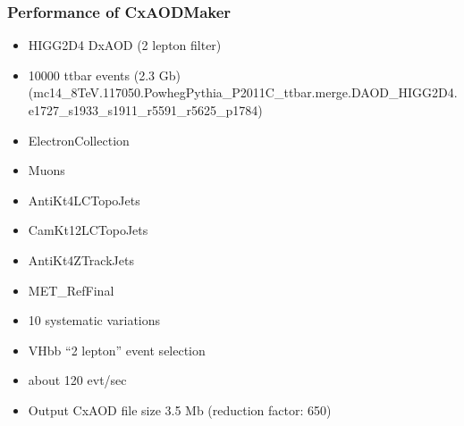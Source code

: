 \documentclass{beamer}
\begin{document}
\begin{frame}
\begin{center}
\end{center}
\end{frame}

\begin{frame}
\frametitle{Performance of CxAODMaker}
\begin{itemize}
 \item HIGG2D4 DxAOD (2 lepton filter)
 \item 10000 ttbar events (2.3 Gb)\\
{\tiny (mc14\_8TeV.117050.PowhegPythia\_P2011C\_ttbar.merge.DAOD\_HIGG2D4.e1727\_s1933\_s1911\_r5591\_r5625\_p1784)}
\end{itemize}
\begin{itemize}
 \item ElectronCollection
 \item Muons
 \item AntiKt4LCTopoJets
 \item CamKt12LCTopoJets
 \item AntiKt4ZTrackJets
 \item MET\_RefFinal
\end{itemize}
\begin{itemize}
 \item 10 systematic variations
 \item VHbb ``2 lepton'' event selection
\end{itemize}
\begin{itemize}
 \item about 120 evt/sec
\end{itemize}
\begin{itemize}
 \item Output CxAOD file size 3.5 Mb (reduction factor: 650)
\end{itemize}
\end{frame}
\end{document}
